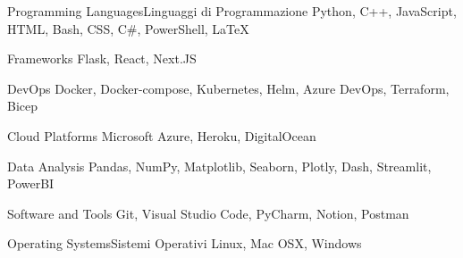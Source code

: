 \begin{cvskills}

\cvskill
{\fi} %
{\fi} %
\end{cvskills}



\begin{cvskills}


\cvskill
{\ifenglish Programming Languages\else Linguaggi di Programmazione\fi} %
{Python, C++, JavaScript, HTML, Bash, CSS, C\#, PowerShell, LaTeX} %

\cvskill
{Frameworks} %
{Flask, React, Next.JS} %


\cvskill
{DevOps} %
{Docker, Docker-compose, Kubernetes, Helm, Azure DevOps, Terraform, Bicep} %

\cvskill
{Cloud Platforms} %
{Microsoft Azure, Heroku, DigitalOcean} %

\cvskill
{Data Analysis} %
{Pandas, NumPy, Matplotlib, Seaborn, Plotly, Dash, Streamlit, PowerBI} %


\cvskill
{Software and Tools} %
{Git, Visual Studio Code, PyCharm, Notion, Postman} %


\cvskill
{\ifenglish Operating Systems\else Sistemi Operativi\fi} %
{Linux, Mac OSX, Windows} %


\end{cvskills}